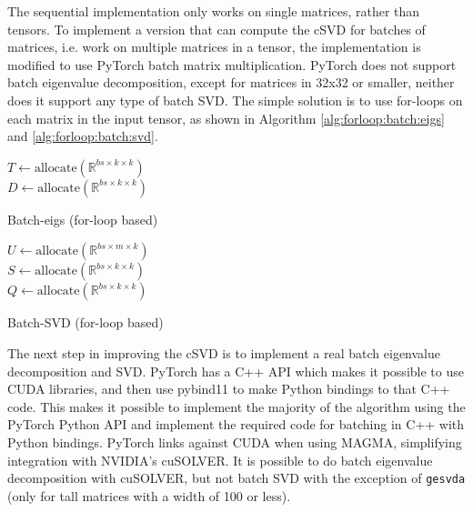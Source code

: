 The sequential implementation only works on single matrices, rather than tensors. To implement a version that can compute the cSVD for batches of matrices, i.e. work on multiple matrices in a tensor, the implementation is modified to use PyTorch batch matrix multiplication. PyTorch does not support batch eigenvalue decomposition, except for matrices in 32x32 or smaller, neither does it support any type of batch SVD. The simple solution is to use for-loops on each matrix in the input tensor, as shown in Algorithm \ref{alg:forloop:batch:eigs} and \ref{alg:forloop:batch:svd}.

\begin{algorithm}[H]
\label{alg:forloop:batch:eigs}
\SetAlgoLined
{}
$T \gets \mathrm{allocate}(\mathbb{R}^{bs \times k \times k})$ \\
$D \gets \mathrm{allocate}(\mathbb{R}^{bs \times k \times k})$ \\
\caption{Batch-eigs (for-loop based)}
\end{algorithm}

\begin{algorithm}[H]
  \label{alg:forloop:batch:svd}
\SetAlgoLined
{}
$U \gets \mathrm{allocate}(\mathbb{R}^{bs \times m \times k})$ \\
$S \gets \mathrm{allocate}(\mathbb{R}^{bs \times k \times k})$ \\
$Q \gets \mathrm{allocate}(\mathbb{R}^{bs \times k \times k})$ \\
\caption{Batch-SVD (for-loop based)}
\end{algorithm}

The next step in improving the cSVD is to implement a real batch eigenvalue decomposition and SVD. PyTorch has a C++ API which makes it possible to use CUDA libraries, and then use pybind11 to make Python bindings to that C++ code. This makes it possible to implement the majority of the algorithm using the PyTorch Python API and implement the required code for batching in C++ with Python bindings. PyTorch links against CUDA when using MAGMA, simplifying integration with NVIDIA's cuSOLVER. It is possible to do batch eigenvalue decomposition with cuSOLVER, but not batch SVD with the exception of \texttt{gesvda} \cite{nvidia:cusolver} (only for tall matrices with a width of 100 or less).

